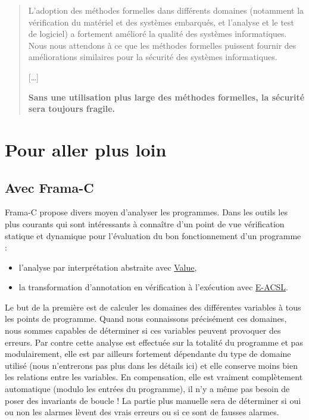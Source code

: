 \documentclass[12pt,francais,]{scrbook}
\providecommand{\tightlist}{%
  \setlength{\itemsep}{0pt}\setlength{\parskip}{0pt}}
\newenvironment{zdssecretblock}[1]{%
  \tcolorbox[beamer,%
    noparskip,breakable,
    colback=LightGray,colframe=DarkGray,%
    colbacklower=LightGray,%
    title=#1]
}{\endtcolorbox}
\begin{document}
\begin{zdssecretblock}{Traduction}
  \begin{quote}
    L'adoption des méthodes formelles dans différents domaines (notamment la
    vérification du matériel et des systèmes embarqués, et l'analyse et le
    test de logiciel) a fortement amélioré la qualité des systèmes
    informatiques. Nous nous attendons à ce que les méthodes formelles
    puissent fournir des améliorations similaires pour la sécurité des
    systèmes informatiques.
    
    {[}\ldots{}{]}
    
    \textbf{Sans une utilisation plus large des méthodes formelles, la
      sécurité sera toujours fragile.}
  \end{quote}
\end{zdssecretblock}


\chapter{Pour aller plus loin}\label{pour-aller-plus-loin}

\section{Avec Frama-C}\label{avec-frama-c}

Frama-C propose divers moyen d'analyser les programmes. Dans les outils
les plus courants qui sont intéressants à connaître d'un point de vue
vérification statique et dynamique pour l'évaluation du bon
fonctionnement d'un programme :

\begin{itemize}
\tightlist
\item
  l'analyse par interprétation abstraite avec
  \href{http://frama-c.com/value.html}{Value},
\item
  la transformation d'annotation en vérification à l'exécution avec
  \href{http://frama-c.com/eacsl.html}{E-ACSL}.
\end{itemize}

Le but de la première est de calculer les domaines des différentes
variables à tous les points de programme. Quand nous connaissons
précisément ces domaines, nous sommes capables de déterminer si ces
variables peuvent provoquer des erreurs. Par contre cette analyse est
effectuée sur la totalité du programme et pas modulairement, elle est
par ailleurs fortement dépendante du type de domaine utilisé (nous
n'entrerons pas plus dans les détails ici) et elle conserve moins bien
les relations entre les variables. En compensation, elle est vraiment
complètement automatique (modulo les entrées du programme), il n'y a
même pas besoin de poser des invariants de boucle ! La partie plus
\og{}manuelle\fg{} sera de déterminer si oui ou non les alarmes lèvent des
vrais erreurs ou si ce sont de fausses alarmes.
\end{document}
